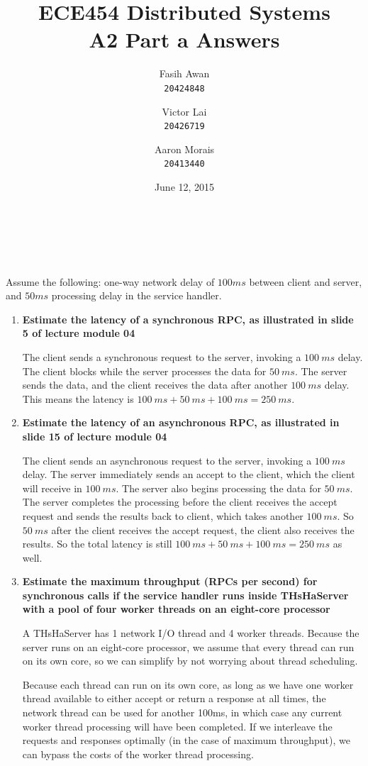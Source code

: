 \documentclass[12pt,a4paper]{article}
\title{
    ECE454 Distributed Systems\\ 
    A2 Part a Answers
}
\author{
    Fasih Awan\\
    \texttt{20424848}
    \and
    Victor Lai\\
    \texttt{20426719}
    \and
    Aaron Morais\\
    \texttt{20413440}
}
\date{
    June 12, 2015
}
\begin{document}
\maketitle
\clearpage

\section{~}

Assume the following: one-way network delay of $100ms$ between client and server, and $50ms$ processing delay in the service handler.

\begin{enumerate}[label=(\alph*)]

\item \textbf{Estimate the latency of a synchronous RPC, as illustrated in slide 5 of lecture module 04}

The client sends a synchronous request to the server, invoking a $100\ ms$ delay. The client blocks while the server processes the data for $50\ ms$. The server sends the data, and the client receives the data after another $100\ ms$ delay. This means the latency is $100\ ms + 50\ ms + 100\ ms = 250\ ms$.

\item \textbf{Estimate the latency of an asynchronous RPC, as illustrated in slide 15 of lecture module 04}

The client sends an asynchronous request to the server, invoking a $100\ ms$ delay. The server immediately sends an accept to the client, which the client will receive in $100\ ms$. The server also begins processing the data for $50\ ms$. The server completes the processing before the client receives the accept request and sends the results back to client, which takes another $100\ ms$. So $50\ ms$ after the client receives the accept request, the client also receives the results. So the total latency is still $100\ ms + 50\ ms + 100\ ms = 250\ ms$ as well. 

\item \textbf{Estimate the maximum throughput (RPCs per second) for synchronous calls if the service handler runs inside THsHaServer with a pool of four worker threads on an eight-core processor}

A THsHaServer has 1 network I/O thread and 4 worker threads. Because the server runs on an eight-core processor, we assume that every thread can run on its own core, so we can simplify by not worrying about thread scheduling.

Because each thread can run on its own core, as long as we have one worker thread available to either accept or return a response at all times, the network thread can be used for another 100ms, in which case any current worker thread processing will have been completed. If we interleave the requests and responses optimally (in the case of maximum throughput), we can bypass the costs of the worker thread processing.


\end{enumerate}
\end{document}
